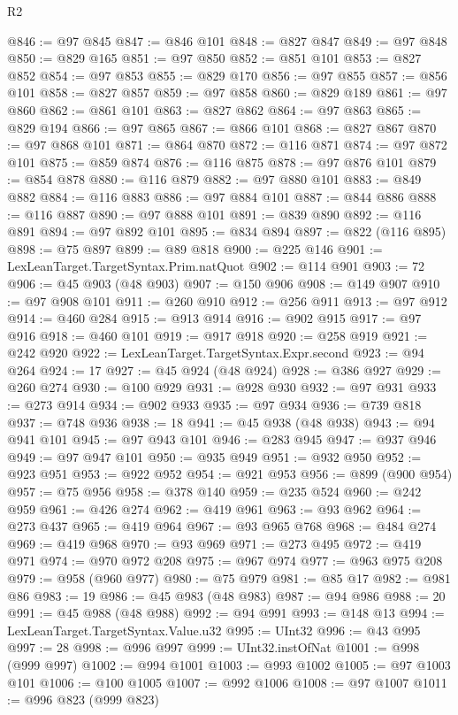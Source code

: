 \begin{lexlean}{R2}
\begin{coremodule}
@846 := @97 @845
@847 := @846 @101
@848 := @827 @847
@849 := @97 @848
@850 := @829 @165
@851 := @97 @850
@852 := @851 @101
@853 := @827 @852
@854 := @97 @853
@855 := @829 @170
@856 := @97 @855
@857 := @856 @101
@858 := @827 @857
@859 := @97 @858
@860 := @829 @189
@861 := @97 @860
@862 := @861 @101
@863 := @827 @862
@864 := @97 @863
@865 := @829 @194
@866 := @97 @865
@867 := @866 @101
@868 := @827 @867
@870 := @97 @868 @101
@871 := @864 @870
@872 := @116 @871
@874 := @97 @872 @101
@875 := @859 @874
@876 := @116 @875
@878 := @97 @876 @101
@879 := @854 @878
@880 := @116 @879
@882 := @97 @880 @101
@883 := @849 @882
@884 := @116 @883
@886 := @97 @884 @101
@887 := @844 @886
@888 := @116 @887
@890 := @97 @888 @101
@891 := @839 @890
@892 := @116 @891
@894 := @97 @892 @101
@895 := @834 @894
@897 := @822 (@116 @895)
@898 := @75 @897
@899 := @89 @818
@900 := @225 @146
@901 := LexLeanTarget.TargetSyntax.Prim.natQuot
@902 := @114 @901
@903 := 72
@906 := @45 @903 (@48 @903)
@907 := @150 @906
@908 := @149 @907
@910 := @97 @908 @101
@911 := @260 @910
@912 := @256 @911
@913 := @97 @912
@914 := @460 @284
@915 := @913 @914
@916 := @902 @915
@917 := @97 @916
@918 := @460 @101
@919 := @917 @918
@920 := @258 @919
@921 := @242 @920
@922 := LexLeanTarget.TargetSyntax.Expr.second
@923 := @94 @264
@924 := 17
@927 := @45 @924 (@48 @924)
@928 := @386 @927
@929 := @260 @274
@930 := @100 @929
@931 := @928 @930
@932 := @97 @931
@933 := @273 @914
@934 := @902 @933
@935 := @97 @934
@936 := @739 @818
@937 := @748 @936
@938 := 18
@941 := @45 @938 (@48 @938)
@943 := @94 @941 @101
@945 := @97 @943 @101
@946 := @283 @945
@947 := @937 @946
@949 := @97 @947 @101
@950 := @935 @949
@951 := @932 @950
@952 := @923 @951
@953 := @922 @952
@954 := @921 @953
@956 := @899 (@900 @954)
@957 := @75 @956
@958 := @378 @140
@959 := @235 @524
@960 := @242 @959
@961 := @426 @274
@962 := @419 @961
@963 := @93 @962
@964 := @273 @437
@965 := @419 @964
@967 := @93 @965 @768
@968 := @484 @274
@969 := @419 @968
@970 := @93 @969
@971 := @273 @495
@972 := @419 @971
@974 := @970 @972 @208
@975 := @967 @974
@977 := @963 @975 @208
@979 := @958 (@960 @977)
@980 := @75 @979
@981 := @85 @17
@982 := @981 @86
@983 := 19
@986 := @45 @983 (@48 @983)
@987 := @94 @986
@988 := 20
@991 := @45 @988 (@48 @988)
@992 := @94 @991
@993 := @148 @13
@994 := LexLeanTarget.TargetSyntax.Value.u32
@995 := UInt32
@996 := @43 @995
@997 := 28
@998 := @996 @997
@999 := UInt32.instOfNat
@1001 := @998 (@999 @997)
@1002 := @994 @1001
@1003 := @993 @1002
@1005 := @97 @1003 @101
@1006 := @100 @1005
@1007 := @992 @1006
@1008 := @97 @1007
@1011 := @996 @823 (@999 @823)

\end{coremodule}
\end{lexlean}
